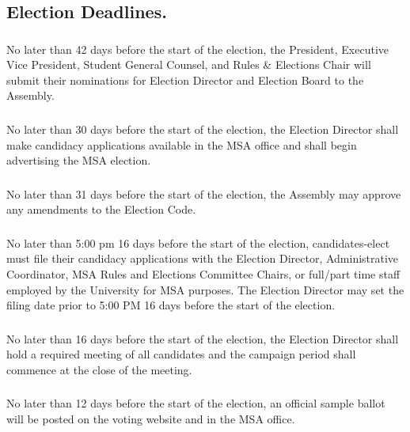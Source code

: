 \subsection{Election Deadlines.}

\subsubsection{}
No later than 42 days before the start of the election, the President, Executive Vice President, Student General Counsel, and Rules \& Elections Chair will submit their nominations for Election Director and Election Board to the Assembly.

\subsubsection{}
No later than 30 days before the start of the election, the Election Director shall make candidacy applications available in the MSA office and shall begin advertising the MSA election.

\subsubsection{}
No later than 31 days before the start of the election, the Assembly may approve any amendments to the Election Code.

\subsubsection{}
No later than 5:00 pm 16 days before the start of the election, candidates-elect must file their candidacy applications with the Election Director, Administrative Coordinator, MSA Rules and Elections Committee Chairs, or full/part time staff employed by the University for MSA purposes. The Election Director may set the filing date prior to 5:00 PM 16 days before the start of the election.

\subsubsection{}
No later than 16 days before the start of the election, the Election Director shall hold a required meeting of all candidates and the campaign period shall commence at the close of the meeting.

\subsubsection{}
No later than 12 days before the start of the election, an official sample ballot will be posted on the voting website and in the MSA office.

